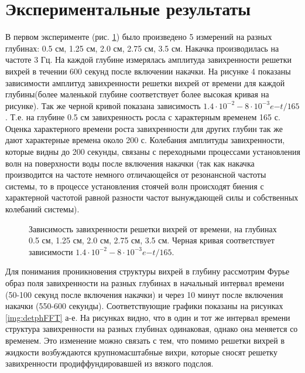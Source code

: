 \section{Экспериментальные результаты} \label{sect6_3}

В первом эксперименте (рис. \ref{img:5deeps}) было произведено 5 измерений на разных глубинах: 0.5 см, 1.25 см, 2.0 см, 2.75 см, 3.5 см. Накачка производилась на частоте 3 Гц. На каждой глубине измерялась амплитуда завихренности решетки вихрей в течении 600 секунд после включении накачки. На рисунке 4 показаны зависимости амплитуд завихренности решетки вихрей от времени для каждой глубины(более маленькой глубине соответствует более высокая кривая на рисунке). Так же черной кривой показана зависимость $1.4 \cdot 10^{-2} - 8 \cdot 10^{-3} e{-t/165}$. Т.е. на глубине 0.5 см завихренность росла с характерным временем 165 с. Оценка характерного времени роста завихренности для других глубин так же дают характерные времена около 200 с. Колебания амплитуды завихренности, которые видны до 200 секунды, связаны с переходными процессами установления волн на поверхности воды после включения накачки (так как накачка производится на частоте немного отличающейся от резонансной частоты системы, то в процессе установления стоячей волн происходят биения с характерной частотой равной разности частот вынуждающей силы и собственных колебаний системы).

\begin{figure}[ht]
  \caption{Зависимость завихренности решетки вихрей от времени, на глубинах 0.5 см, 1.25 см, 2.0 см, 2.75 см, 3.5 см. Черная кривая соответствует зависимости $1.4 \cdot 10^{-2} - 8 \cdot 10^{-3} e{-t/165}$.}
  \label{img:5deeps}  
\end{figure}


Для понимания проникновения структуры вихрей в глубину рассмотрим Фурье образ поля завихренности на разных глубинах в начальный интервал времени (50-100 секунд после включения накачки) и через 10 минут после включения накачки (550-600 секунды). Соответствующие графики показаны на рисунках \ref{img:detphFFT} а-е. На рисунках видно, что в один и тот же интервал времени структура завихренности на разных глубинах одинаковая, однако она меняется со временем. Это изменение можно связать с тем, что помимо решетки вихрей в жидкости возбуждаются крупномасштабные вихри, которые сносят  решетку завихренности продиффундировавшей из вязкого подслоя.

